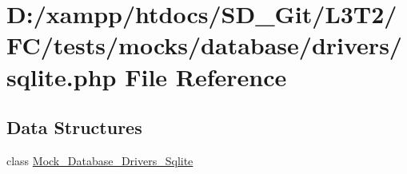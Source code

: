 \hypertarget{tests_2mocks_2database_2drivers_2sqlite_8php}{}\section{D\+:/xampp/htdocs/\+S\+D\+\_\+\+Git/\+L3\+T2/\+F\+C/tests/mocks/database/drivers/sqlite.php File Reference}
\label{tests_2mocks_2database_2drivers_2sqlite_8php}
\subsection*{Data Structures}
\begin{DoxyCompactItemize}
\item 
class \hyperlink{class_mock___database___drivers___sqlite}{Mock\+\_\+\+Database\+\_\+\+Drivers\+\_\+\+Sqlite}
\end{DoxyCompactItemize}

